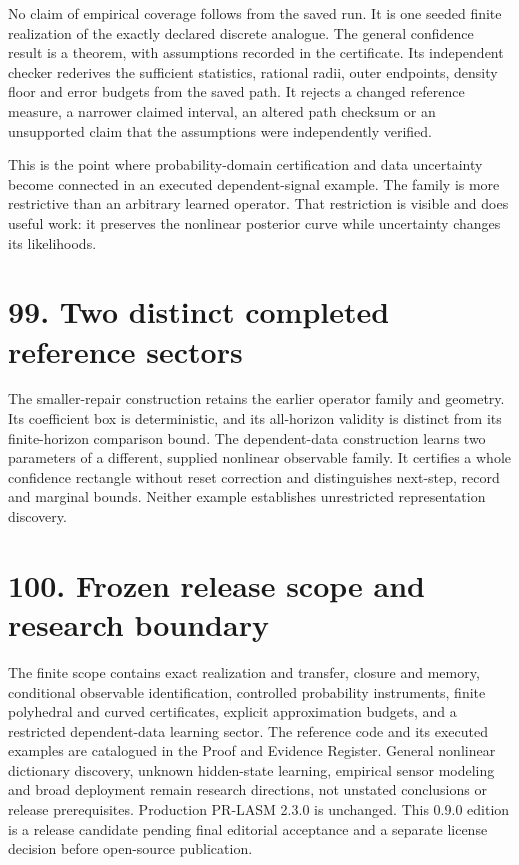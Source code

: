 \documentclass[11pt,letterpaper]{article}
\begin{document}
No claim of empirical coverage follows from the saved run. It is one
seeded finite realization of the exactly declared discrete analogue. The
general confidence result is a theorem, with assumptions recorded in the
certificate. Its independent checker rederives the sufficient
statistics, rational radii, outer endpoints, density floor and error
budgets from the saved path. It rejects a changed reference measure, a
narrower claimed interval, an altered path checksum or an unsupported
claim that the assumptions were independently verified.

This is the point where probability-domain certification and data
uncertainty become connected in an executed dependent-signal example.
The family is more restrictive than an arbitrary learned operator. That
restriction is visible and does useful work: it preserves the nonlinear
posterior curve while uncertainty changes its likelihoods.

\section{99. Two distinct completed reference
sectors}\label{two-distinct-completed-reference-sectors}

The smaller-repair construction retains the earlier operator family and
geometry. Its coefficient box is deterministic, and its all-horizon
validity is distinct from its finite-horizon comparison bound. The
dependent-data construction learns two parameters of a different,
supplied nonlinear observable family. It certifies a whole confidence
rectangle without reset correction and distinguishes next-step, record
and marginal bounds. Neither example establishes unrestricted
representation discovery.

\section{100. Frozen release scope and research
boundary}\label{frozen-release-scope-and-research-boundary}

The finite scope contains exact realization and transfer, closure and
memory, conditional observable identification, controlled probability
instruments, finite polyhedral and curved certificates, explicit
approximation budgets, and a restricted dependent-data learning sector.
The reference code and its executed examples are catalogued in the Proof
and Evidence Register. General nonlinear dictionary discovery, unknown
hidden-state learning, empirical sensor modeling and broad deployment
remain research directions, not unstated conclusions or release
prerequisites. Production PR-LASM 2.3.0 is unchanged. This 0.9.0 edition
is a release candidate pending final editorial acceptance and a separate
license decision before open-source publication.
\end{document}
